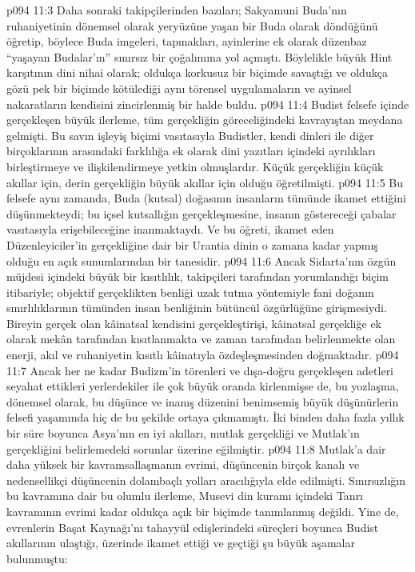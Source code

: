 \vs p094 11:3 Daha sonraki takipçilerinden bazıları; Sakyamuni Buda’nın ruhaniyetinin dönemsel olarak yeryüzüne yaşan bir Buda olarak döndüğünü öğretip, böylece Buda imgeleri, tapınakları, ayinlerine ek olarak düzenbaz “yaşayan Budalar’ın” sınırsız bir çoğalımına yol açmıştı. Böylelikle büyük Hint karşıtının dini nihai olarak; oldukça korkusuz bir biçimde savaştığı ve oldukça gözü pek bir biçimde kötülediği aynı törensel uygulamaların ve ayinsel nakaratların kendisini zincirlenmiş bir halde buldu.
\vs p094 11:4 Budist felsefe içinde gerçekleşen büyük ilerleme, tüm gerçekliğin göreceliğindeki kavrayıştan meydana gelmişti. Bu savın işleyiş biçimi vasıtasıyla Budistler, kendi dinleri ile diğer birçoklarının arasındaki farklılığa ek olarak dini yazıtları içindeki ayrılıkları birleştirmeye ve ilişkilendirmeye yetkin olmuşlardır. Küçük gerçekliğin küçük akıllar için, derin gerçekliğin büyük akıllar için olduğu öğretilmişti.
\vs p094 11:5 Bu felsefe aynı zamanda, Buda (kutsal) doğasının insanların tümünde ikamet ettiğini düşünmekteydi; bu içsel kutsallığın gerçekleşmesine, insanın göstereceği çabalar vasıtasıyla erişebileceğine inanmaktaydı. Ve bu öğreti, ikamet eden Düzenleyiciler’in gerçekliğine dair bir Urantia dinin o zamana kadar yapmış olduğu en açık sunumlarından bir tanesidir.
\vs p094 11:6 Ancak Sidarta’nın özgün müjdesi içindeki büyük bir kısıtlılık, takipçileri tarafından yorumlandığı biçim itibariyle; objektif gerçeklikten benliği uzak tutma yöntemiyle fani doğanın sınırlılıklarının tümünden insan benliğinin bütüncül özgürlüğüne girişmesiydi. Bireyin gerçek olan kâinatsal kendisini gerçekleştirişi, kâinatsal gerçekliğe ek olarak mekân tarafından kısıtlanmakta ve zaman tarafından belirlenmekte olan enerji, akıl ve ruhaniyetin kısıtlı kâinatıyla özdeşleşmesinden doğmaktadır.
\vs p094 11:7 Ancak her ne kadar Budizm’in törenleri ve dışa\hyp{}doğru gerçekleşen adetleri seyahat ettikleri yerlerdekiler ile çok büyük oranda kirlenmişse de, bu yozlaşma, dönemsel olarak, bu düşünce ve inanış düzenini benimsemiş büyük düşünürlerin felsefi yaşamında hiç de bu şekilde ortaya çıkmamıştı. İki binden daha fazla yıllık bir süre boyunca Asya’nın en iyi akılları, mutlak gerçekliği ve Mutlak’ın gerçekliğini belirlemedeki sorunlar üzerine eğilmiştir.
\vs p094 11:8 Mutlak’a dair daha yüksek bir kavramsallaşmanın evrimi, düşüncenin birçok kanalı ve nedensellikçi düşüncenin dolambaçlı yolları aracılığıyla elde edilmişti. Sınırsızlığın bu kavramına dair bu olumlu ilerleme, Musevi din kuramı içindeki Tanrı kavramının evrimi kadar oldukça açık bir biçimde tanımlanmış değildi. Yine de, evrenlerin Başat Kaynağı’nı tahayyül edişlerindeki süreçleri boyunca Budist akıllarının ulaştığı, üzerinde ikamet ettiği ve geçtiği şu büyük aşamalar bulunmuştu:
